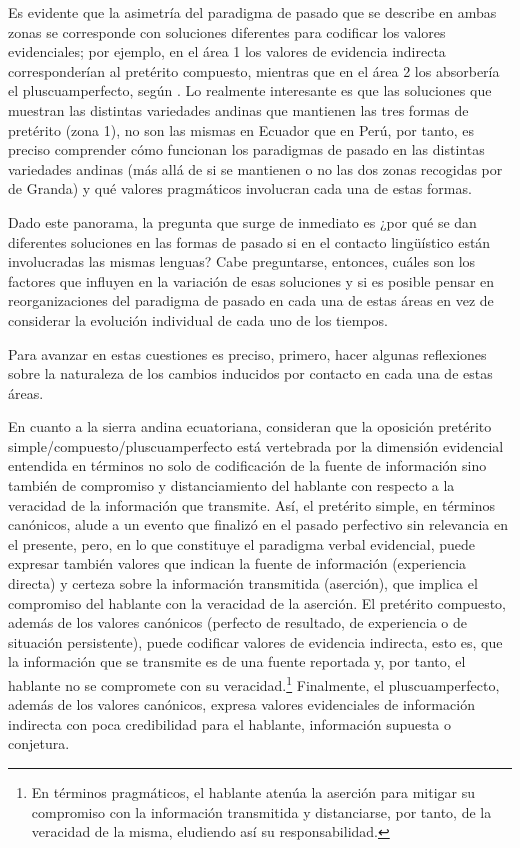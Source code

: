 \documentclass[output=paper]{../langscibook}
\begin{document}
Es evidente que la asimetría del paradigma de pasado que se describe en ambas zonas se corresponde con soluciones diferentes para codificar los valores evidenciales; por ejemplo, en el área 1 los valores de evidencia indirecta corresponderían al pretérito compuesto, mientras que en el área 2 los absorbería el pluscuamperfecto, según \citet{DeGranda2001b}. Lo realmente interesante es que las soluciones que muestran las distintas variedades andinas que mantienen las tres formas de pretérito (zona 1), no son las mismas en Ecuador que en Perú, por tanto, es preciso comprender cómo funcionan los paradigmas de pasado en las distintas variedades andinas (más allá de si se mantienen o no las dos zonas recogidas por de Granda) y qué valores pragmáticos involucran cada una de estas formas.

Dado este panorama, la pregunta que surge de inmediato es ¿por qué se dan diferentes soluciones en las formas de pasado si en el contacto lingüístico están involucradas las mismas lenguas? Cabe preguntarse, entonces, cuáles son los factores que influyen en la variación de esas soluciones y si es posible pensar en reorganizaciones del paradigma de pasado en cada una de estas áreas en vez de considerar la evolución individual de cada uno de los tiempos.

Para avanzar en estas cuestiones es preciso, primero, hacer algunas reflexiones sobre la naturaleza de los cambios inducidos por contacto en cada una de estas áreas. 

En cuanto a la sierra andina ecuatoriana,  \citet{PfänderPalaciosAlcaine2013} consideran que la oposición pretérito simple/compuesto/pluscuamperfecto está vertebrada por la dimensión evidencial entendida en términos no solo de codificación de la fuente de información sino también de compromiso y distanciamiento del hablante con respecto a la veracidad de la información que transmite. Así, el pretérito simple, en términos canónicos, alude a un evento que finalizó en el pasado perfectivo sin relevancia en el presente, pero, en lo que constituye el paradigma verbal evidencial, puede expresar también valores que indican la fuente de información (experiencia directa) y certeza sobre la información transmitida (aserción), que implica el compromiso del hablante con la veracidad de la aserción. El pretérito compuesto, además de los valores canónicos (perfecto de resultado, de experiencia o de situación persistente), puede codificar valores de evidencia indirecta, esto es, que la información que se transmite es de una fuente reportada y, por tanto, el hablante no se compromete con su veracidad.\footnote{En términos pragmáticos, el hablante atenúa la aserción para mitigar su compromiso con la información transmitida y distanciarse, por tanto, de la veracidad de la misma, eludiendo así su responsabilidad.} Finalmente, el pluscuamperfecto, además de los valores canónicos, expresa valores evidenciales de información indirecta con poca credibilidad para el hablante, información supuesta o conjetura.
\end{document}
